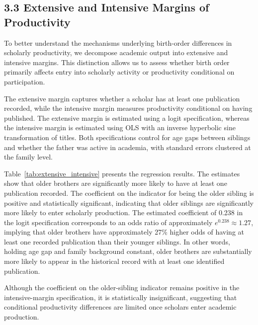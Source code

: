 
\FloatBarrier

\subsection*{3.3 Extensive and Intensive Margins of Productivity}

To better understand the mechanisms underlying birth-order differences in scholarly productivity, we decompose academic output into extensive and intensive margins. This distinction allows us to assess whether birth order primarily affects entry into scholarly activity or productivity conditional on participation.

The extensive margin captures whether a scholar has at least one publication recorded, while the intensive margin measures productivity conditional on having published. The extensive margin is estimated using a logit specification, whereas the intensive margin is estimated using OLS with an inverse hyperbolic sine transformation of titles. Both specifications control for age gaps between siblings and whether the father was active in academia, with standard errors clustered at the family level.

Table~\ref{tab:extensive_intensive} presents the regression results. The estimates show that older brothers are significantly more likely to have at least one publication recorded. The coefficient on the indicator for being the older sibling is positive and statistically significant, indicating that older siblings are significantly more likely to enter scholarly production. The estimated coefficient of 0.238 in the logit specification corresponds to an odds ratio of approximately $e^{0.238} \approx 1.27$, implying that older brothers have approximately 27\% higher odds of having at least one recorded publication than their younger siblings. In other words, holding age gap and family background constant, older brothers are substantially more likely to appear in the historical record with at least one identified publication.

Although the coefficient on the older-sibling indicator remains positive in the intensive-margin specification, it is statistically insignificant, suggesting that conditional productivity differences are limited once scholars enter academic production.

